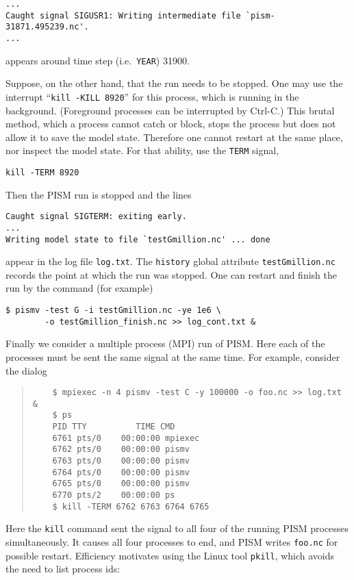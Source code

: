 \begin{verbatim}
...
Caught signal SIGUSR1: Writing intermediate file `pism-31871.495239.nc'.
...
\end{verbatim}
\noindent appears around time step (i.e.~\verb|YEAR|) 31900.

Suppose, on the other hand, that the run needs to be stopped.  One may use the interrupt ``\verb|kill -KILL 8920|'' for this process, which is running in the background.  (Foreground processes can be interrupted by Ctrl-C.)  This brutal method, which a process cannot catch or block, stops the process but does not allow it to save the model state.  Therefore one cannot restart at the same place, nor inspect the model state.  For that ability, use the \verb|TERM| signal,

\verb|kill -TERM 8920|

\noindent Then the PISM run is stopped and the lines
\begin{verbatim}
Caught signal SIGTERM: exiting early.
...
Writing model state to file `testGmillion.nc' ... done
\end{verbatim}
\noindent appear in the log file \verb|log.txt|.  The \verb|history| global attribute \verb|testGmillion.nc| records the point at which the run was stopped.  One can restart and finish the run by the command (for example)

\begin{verbatim}
$ pismv -test G -i testGmillion.nc -ye 1e6 \
        -o testGmillion_finish.nc >> log_cont.txt &
\end{verbatim}

\smallskip

Finally we consider a multiple process (MPI) run of PISM.  Here each of the processes must be sent the same signal at the same time.  For example, consider the dialog
\begin{quote}
\begin{verbatim}
	$ mpiexec -n 4 pismv -test C -y 100000 -o foo.nc >> log.txt &
	$ ps
	PID TTY          TIME CMD
	6761 pts/0    00:00:00 mpiexec
	6762 pts/0    00:00:00 pismv
	6763 pts/0    00:00:00 pismv
	6764 pts/0    00:00:00 pismv
	6765 pts/0    00:00:00 pismv
	6770 pts/2    00:00:00 ps
	$ kill -TERM 6762 6763 6764 6765
\end{verbatim}
\end{quote}
Here the \verb|kill| command sent the signal to all four of the running PISM processes simultaneously.  It causes all four processes to end, and PISM writes \verb|foo.nc| for possible restart.  Efficiency motivates using the Linux tool \verb|pkill|, which avoids the need to list process ids:

